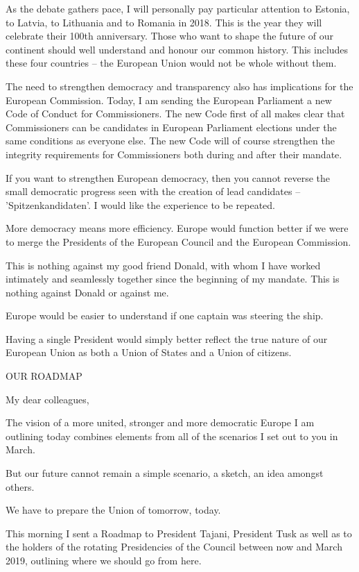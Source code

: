 \documentclass[a4paper,11pt]{article}
\begin{document}
As the debate gathers pace, I will personally pay particular attention to Estonia, to Latvia, to Lithuania and to Romania in 2018. This is the year they will celebrate their 100th anniversary. Those who want to shape the future of our continent should well understand and honour our common history. This includes these four countries – the European Union would not be whole without them.

The need to strengthen democracy and transparency also has implications for the European Commission. Today, I am sending the European Parliament a new Code of Conduct for Commissioners. The new Code first of all makes clear that Commissioners can be candidates in European Parliament elections under the same conditions as everyone else. The new Code will of course strengthen the integrity requirements for Commissioners both during and after their mandate.

If you want to strengthen European democracy, then you cannot reverse the small democratic progress seen with the creation of lead candidates – 'Spitzenkandidaten'. I would like the experience to be repeated.

More democracy means more efficiency. Europe would function better if we were to merge the Presidents of the European Council and the European Commission.

This is nothing against my good friend Donald, with whom I have worked intimately and seamlessly together since the beginning of my mandate. This is nothing against Donald or against me.

Europe would be easier to understand if one captain was steering the ship.

Having a single President would simply better reflect the true nature of our European Union as both a Union of States and a Union of citizens.

 

 

OUR ROADMAP

My dear colleagues,

The vision of a more united, stronger and more democratic Europe I am outlining today combines elements from all of the scenarios I set out to you in March.

But our future cannot remain a simple scenario, a sketch, an idea amongst others.

We have to prepare the Union of tomorrow, today.

This morning I sent a Roadmap to President Tajani, President Tusk as well as to the holders of the rotating Presidencies of the Council between now and March 2019, outlining where we should go from here.
\end{document}
